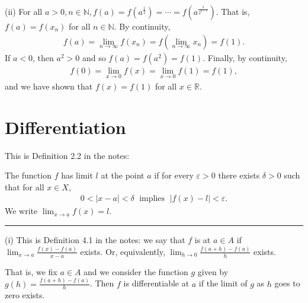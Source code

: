 \documentclass[letterpaper,10pt,english]{jupyterBook}
\begin{document}
\sphinxAtStartPar
(ii) For all \(a>0, n\in\mathbb{N}, f(a) = f\left(a^{\frac{1}{2}}\right) = \cdots = f\left(a^{\frac{1}{2^{n-1}}}\right)\). That is, \(f(a)=f(x_n)\) for all \(n\in\mathbb{N}\). By continuity,
\begin{equation*}
\begin{split}
f(a) = \lim_{n\rightarrow\infty} f(x_n) = f\left(\lim_{n\rightarrow\infty} x_n\right) = f(1).
\end{split}
\end{equation*}
\sphinxAtStartPar
If \(a<0\), then \(a^2>0\) and so \(f(a)=f\left(a^2\right)=f(1)\). Finally, by continuity,
\begin{equation*}
\begin{split}
f(0)=\lim_{x\rightarrow 0}f(x) = \lim_{x\rightarrow 0}f(1) = f(1),
\end{split}
\end{equation*}
\sphinxAtStartPar
and we have shown that \(f(x)=f(1)\) for all \(x\in\mathbb{R}\).


\section{Differentiation}
\label{\detokenize{Solutions-upto46:differentiation}}\label{\detokenize{Solutions-upto46:ch4sol}}
\sphinxAtStartPar
{\hyperref[\detokenize{Problems:id37}]{}} This is Definition 2.2 in the notes:

The function \(f\) has limit \(l\) at the point \(a\) if for every \(\varepsilon>0\) there exists \(\delta>0\) such that for all \(x\in X\),
\begin{equation*}
\begin{split}
0<|x-a|<\delta \; \text{ implies } \; |f(x)-l|<\varepsilon.
\end{split}
\end{equation*}
\sphinxAtStartPar
We write \(\lim_{x\to a}f(x)=l\).


\bigskip\hrule\bigskip


\sphinxAtStartPar
{\hyperref[\detokenize{Problems:id38}]{}}

\sphinxAtStartPar
(i) This is Definition 4.1 in the notes: we say that \(f\) is  at \(a \in A\) if \( \lim_{x \rightarrow a}\frac{f(x) - f(a)}{x - a}\) exists. Or, equivalently, \( \lim_{h \rightarrow 0}\frac{f(a +h) - f(a)}{h}\) exists.

That is, we fix \(a\in A\) and we consider the function \(g\) given by \(g(h)=\frac{f(a +h) - f(a)}{h}\). Then \(f\) is differentiable at \(a\) if the limit of \(g\) as \(h\) goes to zero exists.
\end{document}
